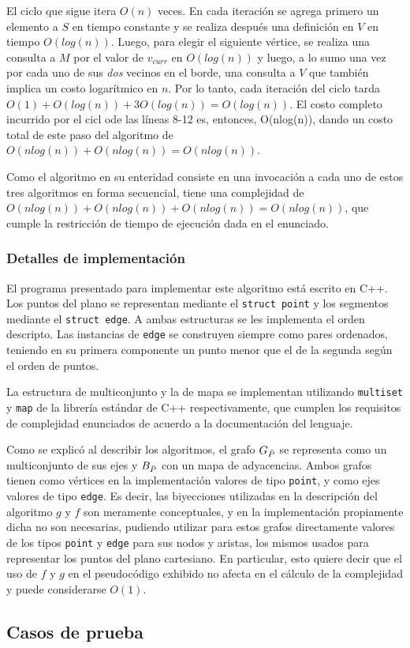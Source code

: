 El ciclo que sigue itera $O(n)$ veces. En cada iteración se agrega primero un elemento a $S$ en tiempo constante y se realiza después una definición en $V$ en tiempo $O(log(n))$. Luego, para elegir el siguiente vértice, se realiza una consulta a $M$ por el valor de $v_{\mathit{curr}}$ en $O(log(n))$ y luego, a lo sumo una vez por cada uno de sus \textit{dos} vecinos en el borde, una consulta a $V$ que también implica un costo logarítmico en $n$. Por lo tanto, cada iteración del ciclo tarda $O(1) + O(log(n)) + 3O(log(n)) = O(log(n))$. El costo completo incurrido por el cicl ode las líneas 8-12 es, entonces, O(nlog(n)), dando un costo total de este paso del algoritmo de $O(n log(n)) + O(n log(n)) = O(nlog(n))$.

\medskip

Como el algoritmo en su enteridad consiste en una invocación a cada uno de estos tres algoritmos en forma secuencial, tiene una complejidad de $O(n log(n)) + O(n log(n)) + O(n log(n)) = O(n log(n))$, que cumple la restricción de tiempo de ejecución dada en el enunciado.

\subsubsection{Detalles de implementación}

El programa presentado para implementar este algoritmo está escrito en C++. Los puntos del plano se representan mediante el \texttt{struct point} y los segmentos mediante el \texttt{struct edge}. A ambas estructuras se les implementa el orden descripto. Las instancias de \texttt{edge} se construyen siempre como pares ordenados, teniendo en su primera componente un punto menor que el de la segunda según el orden de puntos.

La estructura de multiconjunto y la de mapa se implementan utilizando \texttt{multiset} y \texttt{map} de la librería estándar de C++ respectivamente, que cumplen los requisitos de complejidad enunciados de acuerdo a la documentación del lenguaje.

Como se explicó al describir los algoritmos, el grafo $G_{\bar{P}}$ se representa como un multiconjunto de sus ejes y $B_{\bar{P}}$ con un mapa de adyacencias. Ambos grafos tienen como vértices en la implementación valores de tipo \texttt{point}, y como ejes valores de tipo \texttt{edge}. Es decir, las biyecciones utilizadas en la descripción del algoritmo $g$ y $f$ son meramente conceptuales, y en la implementación propiamente dicha no son necesarias, pudiendo utilizar para estos grafos directamente valores de los tipos \texttt{point} y \texttt{edge} para sus nodos y aristas, los mismos usados para representar los puntos del plano cartesiano. En particular, esto quiere decir que el uso de $f$ y $g$ en el pseudocódigo exhibido no afecta en el cálculo de la complejidad y puede considerarse $O(1)$.

\subsection{Casos de prueba}

